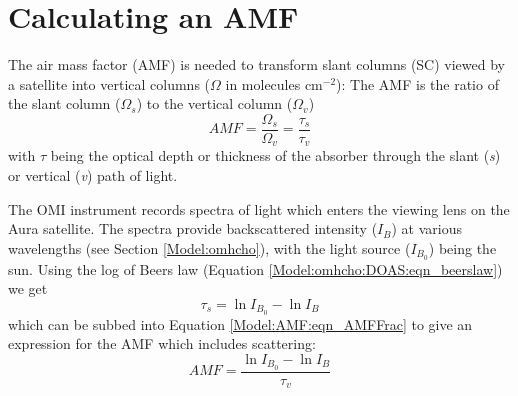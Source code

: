 \section{Calculating an AMF}
  \label{Model:AMF}
  
  The air mass factor (AMF) is needed to transform slant columns (SC) viewed by a satellite into vertical columns ($\Omega$ in molecules cm$^{-2}$):
  The AMF is the ratio of the slant column ($\Omega_s$) to the vertical column ($\Omega_v$)
  \begin{equation} \label{Model:AMF:eqn_AMFFrac}
    AMF=\frac{\Omega_s}{\Omega_v} = \frac{\tau_s}{\tau_v}
  \end{equation}
  with $\tau$ being the optical depth or thickness of the absorber through the slant (\textit{s}) or vertical (\textit{v}) path of light.
  
  
  The OMI instrument records spectra of light which enters the viewing lens on the Aura satellite.
  The spectra provide backscattered intensity ($I_B$) at various wavelengths (see Section \ref{Model:omhcho}), with the light source ($I_{B_0}$) being the sun. 
  Using the log of Beers law (Equation \ref{Model:omhcho:DOAS:eqn_beerslaw}) we get 
  $$ \tau_s = \ln{I_{B_0}} - \ln{I_B} $$
  which can be subbed into Equation \ref{Model:AMF:eqn_AMFFrac} to give an expression for the AMF which includes scattering:
  \begin{equation} \label{Model:AMF:eqn_amfscattering}
    AMF = \frac{\ln{I_{B_0}}-\ln{I_B}}{\tau_v}
  \end{equation}
  
